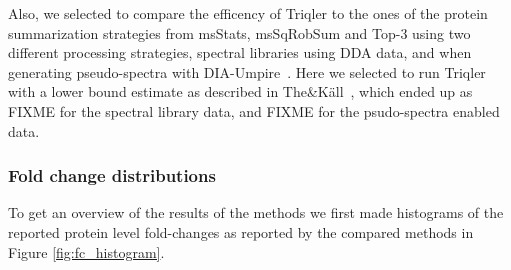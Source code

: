 \documentclass[10pt,letterpaper]{article}
\begin{document}
Also, we selected to compare the efficency of Triqler to the ones of the protein summarization strategies from msStats, msSqRobSum and Top-3 using two different processing strategies, spectral libraries using DDA data, and when generating pseudo-spectra with DIA-Umpire~\cite{tsou2015dia}. Here we selected to run Triqler with a lower bound estimate as described in The\&K\"{a}ll~\cite{the2021triqler}, which ended up as FIXME for the spectral library data, and FIXME for the psudo-spectra enabled data.

\subsubsection*{Fold change distributions}

To get an overview of the results of the methods we first made histograms of the reported protein level fold-changes as reported by the compared methods in Figure \ref{fig:fc_histogram}.  
\end{document}
